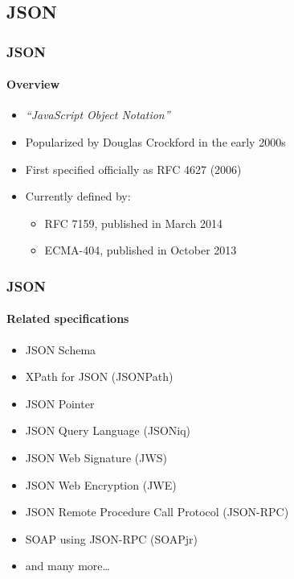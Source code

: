 \documentclass[
    alternativetitlepage=bild,
    cornerlogo=hgi_nds_logo2,
    sectionoverview,
]{rubpresentation}
\begin{document}
\subsection{JSON}

\begin{frame}[plain]
    \frametitle{JSON}
    \framesubtitle{Overview}
    \begin{itemize}
        \item{} \emph{\enquote{JavaScript Object Notation}}\\
        \item{} Popularized by Douglas Crockford in the early 2000s\\
        \item{} First specified officially as RFC 4627 (2006)\\
        \item{} Currently defined by:
            \begin{itemize}
                \item{} RFC 7159, published in March 2014\\
                \item{} ECMA-404, published in October 2013\\
            \end{itemize}
    \end{itemize}
\end{frame}

\begin{frame}[plain]
    \frametitle{JSON}
    \framesubtitle{Related specifications}
    \begin{itemize}
        \item{} JSON Schema\\
        \item{} XPath for JSON (JSONPath)\\
        \item{} JSON Pointer\\
        \item{} JSON Query Language (JSONiq)\\
        \item{} JSON Web Signature (JWS)
        \item{} JSON Web Encryption (JWE)
        \item{} JSON Remote Procedure Call Protocol (JSON-RPC)\\
        \item{} SOAP using JSON-RPC (SOAPjr)\\
        \item{} and many more\ldots{}\\
    \end{itemize}
\end{frame}
\end{document}
